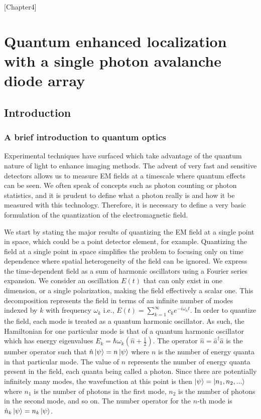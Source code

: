 [Chapter4]

\chapter{Quantum enhanced localization with a single photon avalanche diode array}

\section{Introduction}

\subsection{A brief introduction to quantum optics}

Experimental techniques have surfaced which take advantage of the quantum nature of light to enhance imaging methods. The advent of very fast and sensitive detectors allows us to measure EM fields at a timescale where quantum effects can be seen. We often speak of concepts such as photon counting or photon statistics, and it is prudent to define what a photon really is and how it be measured with this technology. Therefore, it is necessary to define a very basic formulation of the quantization of the electromagnetic field. 

We start by stating the major results of quantizing the EM field at a single point in space, which could be a point detector element, for example. Quantizing the field at a single point in space simplifies the problem to focusing only on time dependence where spatial heterogeneity of the field can be ignored. We express the time-dependent field as a sum of harmonic oscillators using a Fourier series expansion. We consider an oscillation $E(t)$ that can only exist in one dimension, or a single polarization, making the field effectively a scalar one. This decomposition represents the field in terms of an infinite number of modes indexed by $k$ with frequency $\omega_{k}$ i.e., $E(t) = \sum_{k=1}^\infty c_{k}e^{-i\omega_{n} t}$. In order to quantize the field, each mode is treated as a quantum harmonic oscillator. As such, the Hamiltonian for one particular mode is that of a quantum harmonic oscillator which has energy eigenvalues $E_{k} = \hbar\omega_{k}(\hat{n} + \frac{1}{2})$. The operator $\hat{n}=\hat{a}^{\dagger}\hat{a}$ is the number operator such that $\hat{n}\ket{\psi} = n\ket{\psi}$ where $n$ is the number of energy quanta in that particular mode. The value of $n$ represents the number of energy quanta present in the field, each quanta being called a photon. Since there are potentially infinitely many modes, the wavefunction at this point is then $\ket{\psi} = \ket{n_{1},n_{2},...}$ where $n_1$ is the number of photons in the first mode, $n_2$ is the number of photons in the second mode, and so on. The number operator for the $n$-th mode is $\hat{n}_k\ket{\psi} = n_{k}\ket{\psi}$. 

